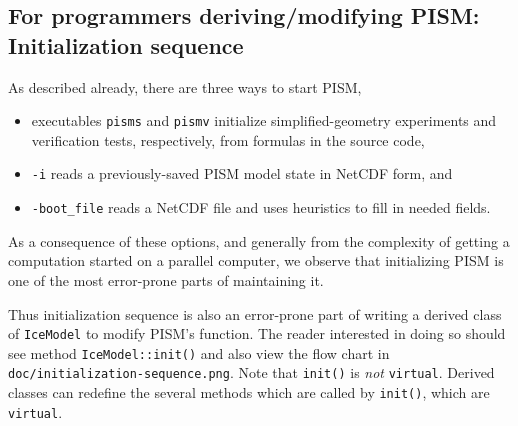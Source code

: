 \documentclass[titlepage,letterpaper,final]{scrartcl}
\begin{document}
\subsection{For programmers deriving/modifying PISM:  Initialization sequence}  As described already, there are three ways to start PISM,\begin{itemize}
\item executables \texttt{pisms} and \texttt{pismv} initialize simplified-geometry experiments and verification tests, respectively, from formulas in the source code,
\item \texttt{-i} reads a previously-saved PISM model state in NetCDF form, and
\item \texttt{-boot_file} reads a NetCDF file and uses heuristics to fill in needed fields.
\end{itemize}
As a consequence of these options, and generally from the complexity of getting a computation started on a parallel computer, we observe that initializing PISM is one of the most error-prone parts of maintaining it.

Thus initialization sequence is also an error-prone part of writing a derived class of \texttt{IceModel} to modify PISM's function.  The reader interested in doing so should see method \texttt{IceModel::init()} and also view the flow chart in \texttt{doc/initialization-sequence.png}.  Note that \texttt{init()} is \emph{not} \texttt{virtual}.  Derived classes can redefine the several methods which are called by \texttt{init()}, which are \texttt{virtual}.


\clearpage\newpage


\clearpage\newpage


\clearpage\newpage


\clearpage\newpage


\clearpage\newpage


\clearpage\newpage


\clearpage\newpage


\clearpage\newpage



{}
\label{sect:index}
\printindex

{}
\printindex[options]
\end{document}
